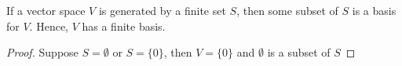 \begin{theorem}[ ]
   If a vector space \( V  \) is generated by a finite set \( S  \), then some subset of \( S  \) is a basis for \( V  \). Hence, \( V  \) has a finite basis. 
\end{theorem}
\begin{proof}
    Suppose \( S = \emptyset \) or \( S = \{ 0 \}  \), then \( V = \{  0  \}  \) and \( \emptyset \) is a subset of \( S  \) 
\end{proof}


